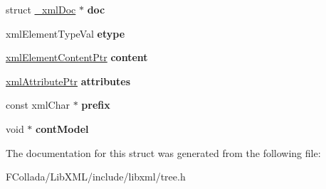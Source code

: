 \begin{DoxyCompactItemize}
\item 
\hypertarget{struct__xmlElement_a89d834f3cd5e42d21d59e7476cf5b7f9}{
struct \hyperlink{struct__xmlDoc}{\_\-xmlDoc} $\ast$ {\bfseries doc}}
\label{struct__xmlElement_a89d834f3cd5e42d21d59e7476cf5b7f9}

\item 
\hypertarget{struct__xmlElement_a3f7566085877a63b728c8596438a9540}{
xmlElementTypeVal {\bfseries etype}}
\label{struct__xmlElement_a3f7566085877a63b728c8596438a9540}

\item 
\hypertarget{struct__xmlElement_ac934ce51a0a220c511c1700c3694e0e7}{
\hyperlink{struct__xmlElementContent}{xmlElementContentPtr} {\bfseries content}}
\label{struct__xmlElement_ac934ce51a0a220c511c1700c3694e0e7}

\item 
\hypertarget{struct__xmlElement_a45468a87059e899da068a6cc04e6a943}{
\hyperlink{struct__xmlAttribute}{xmlAttributePtr} {\bfseries attributes}}
\label{struct__xmlElement_a45468a87059e899da068a6cc04e6a943}

\item 
\hypertarget{struct__xmlElement_a5c499467a4b209f6881220594db90650}{
const xmlChar $\ast$ {\bfseries prefix}}
\label{struct__xmlElement_a5c499467a4b209f6881220594db90650}

\item 
\hypertarget{struct__xmlElement_a8f4ac69355ce0e5b4ddab81d91116302}{
void $\ast$ {\bfseries contModel}}
\label{struct__xmlElement_a8f4ac69355ce0e5b4ddab81d91116302}

\end{DoxyCompactItemize}


The documentation for this struct was generated from the following file:\begin{DoxyCompactItemize}
\item 
FCollada/LibXML/include/libxml/tree.h\end{DoxyCompactItemize}
